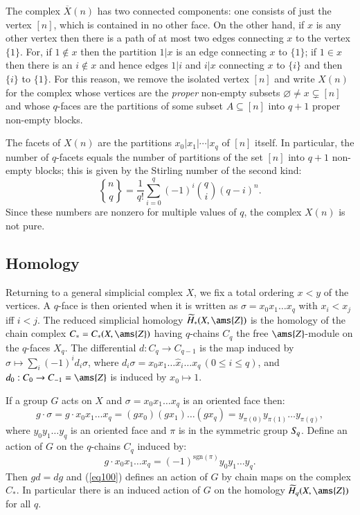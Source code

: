 \documentclass[matann2]{svjour1}
\def\Z{\ams{Z}}
\def\ss{\sigma}
\def\ra{\rightarrow}
\DeclareRobustCommand{\stirling}{\genfrac\{\}{0pt}{}}
\begin{document}
The complex $\overline{X}(n)$ has two connected components: one
consists of just the vertex
$[n]$, which is contained in no other face. On the other hand,
if $x$ is any other vertex then there is a path of at
most two edges connecting $x$ to the vertex $\{1\}$. For, if $1\not
\in x$ then the partition $1|x$ is an edge connecting $x$ to $\{1\}$; if $1\in
x$ then there is an $i\not\in x$ and hence edges $1|i$ and $i|x$ connecting
$x$ to $\{i\}$ and then $\{i\}$ to $\{1\}$. For this reason, we remove
the isolated vertex $[n]$ 
and write $X(n)$ for the complex whose vertices are the \emph{proper\/}
non-empty subsets $\varnothing\not=x\subsetneq [n]$ and whose
$q$-faces are 
the partitions of some subset $A\subseteq [n]$ into $q+1$ proper non-empty
blocks. 

The facets of $X(n)$ are the partitions $x_0|x_1|\cdots|x_q$ of $[n]$ itself.
In particular, the number of $q$-facets equals the number of partitions
of the set $[n]$ into $q+1$ non-empty blocks; this is given by the Stirling
number of the second kind:
$$
\stirling{n}{q}=
\frac{1}{q!}\sum_{i=0}^{q}(-1)^i\binom{q}{i}(q-i)^n.
$$
Since these numbers are nonzero for multiple values of $q$,
the complex $X(n)$ is not pure. 


\subsection{Homology}
\label{subsection:homology}

Returning to a general simplicial complex $X$, we
fix a total ordering $x<y$ of the vertices. A $q$-face is then oriented
when it is written as 
$\ss=x_0x_1\ldots x_q$ with $x_i<x_j$ iff $i<j$.
The reduced simplicial 
homology $\widetilde{H}_*(X,\Z)$
is the
homology of the chain complex $C_*=C_*(X,\Z)$ having $q$-chains
$C_q$ the free $\Z$-module on the $q$-faces $X_q$. The 
differential $d:C_q\ra C_{q-1}$ is the map induced by
$\ss
\mapsto
\sum_i (-1)^i d_i\ss$, where
$d_i\ss=x_0x_1\ldots \widehat{x}_i\ldots x_q\,(0\leq i\leq q)$,
and $d_0:C_0\ra C_{-1}= \Z$ 
is induced by $x_0\mapsto 1$.

If a group $G$ acts on $X$ and $\ss=x_0x_1\ldots x_q$ is an oriented 
face then: 
$$
g\cdot\ss=g\cdot x_0x_1\ldots x_q=(gx_0)(gx_1)\ldots (gx_q)
=y_{\pi(0)}y_{\pi(1)}\ldots y_{\pi(q)},
$$
where $y_0y_1\ldots y_q$ is an oriented face and $\pi$ is in the 
symmetric group $S_{\kern-1pt q}$. Define an action of $G$ on the $q$-chains
$C_q$ induced by:
\begin{equation}
\label{eq100}
    g\cdot x_0x_1\ldots x_q=(-1)^{\text{sgn}(\pi)} y_0y_1\ldots y_q.
\end{equation}
Then $gd=dg$ and (\ref{eq100}) defines an action of $G$ by chain maps 
on the complex $C_*$. In particular 
there is an induced action of $G$ on the
homology $\widetilde{H}_q(X,\Z)$ for all $q$. 
\end{document}
